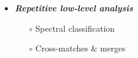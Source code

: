 \begin{frame}
\begin{columns}[T]
\begin{column}{.6\textwidth}
\begin{overlayarea}{\textwidth}{\textheight}
\begin{onlyenv}
\begin{itemize}[<.->]
            \vspace{0.5em}
            \item \emph{\bf Repetitive low-level analysis}
              \begin{itemize}[<.->]
                \item[$\circ$] Spectral classification
                \item[$\circ$] Cross-matches \& merges
              \end{itemize}

          \end{itemize}
        \end{onlyenv}
      \end{overlayarea}
    \end{column}
  
  \end{columns}

\end{frame}

